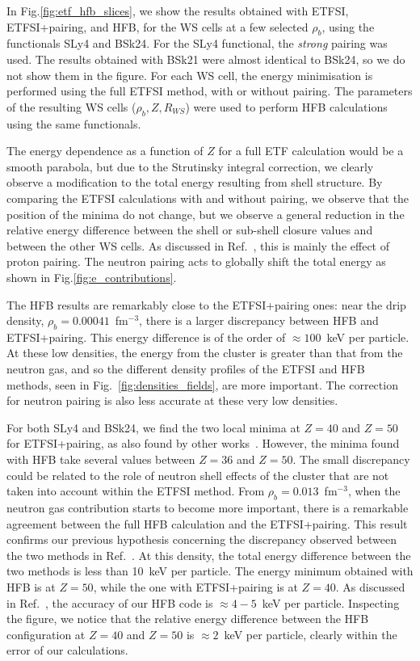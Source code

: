 \documentclass[
    amsmath,amssymb,
    aps,
    prc,
    floatfix,
]{revtex4-2}
\begin{document}
In Fig.\ref{fig:etf_hfb_slices}, we show the results obtained with ETFSI, ETFSI+pairing, and HFB, for the WS cells at a few selected $\rho_b$, using the functionals SLy4 and BSk24. For the SLy4 functional, the \emph{strong} pairing was used. The results obtained with  BSk21 were almost identical to BSk24, so we do not show them in the figure.
For each WS cell, the energy minimisation is performed using the full ETFSI method, with or without pairing. The parameters of the resulting WS cells ($\rho_b, Z, R_{WS}$) were used to perform HFB calculations using the same functionals. 

The energy dependence as a function of $Z$ for a full ETF calculation would be a smooth parabola, but due to the Strutinsky integral correction, we clearly observe a modification to the total energy resulting from shell structure.
By comparing the ETFSI calculations with and without pairing, we observe that the position of the minima do not change, but we observe a general reduction in the relative energy difference between the shell or sub-shell closure values and between the other WS cells. As discussed in Ref.~\cite{pearson2015role}, this is mainly the effect of proton pairing. The neutron pairing acts to globally shift the total energy as shown in Fig.\ref{fig:e_contributions}.

The HFB results are remarkably close to the ETFSI+pairing ones: near the drip density, $\rho_b=0.00041$~fm$^{-3}$, there is a larger discrepancy between HFB and ETFSI+pairing. This energy difference is of the order of $\approx100$~keV per particle. At these low densities, the energy from the cluster is greater than that from the neutron gas, and so the different density profiles of the ETFSI and HFB methods, seen in Fig.~\ref{fig:densities_fields}, are more important. The correction for neutron pairing is also less accurate at these very low densities.

For both SLy4 and BSk24, we find the two local minima at $Z=40$ and $Z=50$ for ETFSI+pairing, as also found by other works~\cite{pearsonInnerCrustNeutron2012,pearson2015role,pearsonUnifiedEquationsState2018,pearsonErratumUnifiedEquations2019}. However, the minima found with HFB take several values between $Z=36$ and $Z=50$. 
The small discrepancy could be related to the role of neutron shell effects of the cluster that are not taken into account within the ETFSI method. From $\rho_b=0.013$~fm$^{-3}$, when the neutron gas contribution starts to become more important, there is a remarkable agreement between the full HFB calculation and the ETFSI+pairing. This result confirms our previous hypothesis concerning the discrepancy observed between the two methods in Ref.~\cite{shelley2020accurately}.
At this density, the total energy difference between the two methods is less than 10~keV per particle. The energy minimum obtained with HFB is at $Z=50$, while the one with ETFSI+pairing is at $Z=40$. As discussed in Ref.~\cite{pastore2017new}, the accuracy of our HFB code is $\approx4-5$~keV per particle. Inspecting the figure, we notice that the relative energy difference between the HFB configuration at $Z=40$ and $Z=50$ is $\approx2$~keV per particle, clearly within the error of our calculations.
\end{document}
